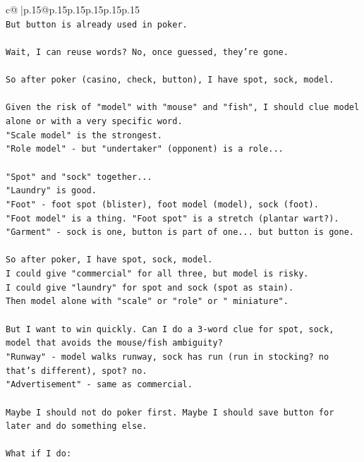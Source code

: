 \documentclass{article}
\begin{document}
{\begin{supertabular}{c@{$\;$}|p{.15\linewidth}@{}p{.15\linewidth}p{.15\linewidth}p{.15\linewidth}p{.15\linewidth}p{.15\linewidth}}
{{{\\ 
\texttt{But button is already used in poker.} \\
\\ 
\texttt{Wait, I can reuse words? No, once guessed, they're gone.} \\
\\ 
\texttt{So after poker (casino, check, button), I have spot, sock, model.} \\
\\ 
\texttt{Given the risk of "model" with "mouse" and "fish", I should clue model alone or with a very specific word.} \\
\texttt{"Scale model" is the strongest.} \\
\texttt{"Role model" {-} but "undertaker" (opponent) is a role...} \\
\\ 
\texttt{"Spot" and "sock" together...} \\
\texttt{"Laundry" is good.} \\
\texttt{"Foot" {-} foot spot (blister), foot model (model), sock (foot).} \\
\texttt{"Foot model" is a thing. "Foot spot" is a stretch (plantar wart?).} \\
\texttt{"Garment" {-} sock is one, button is part of one... but button is gone.} \\
\\ 
\texttt{So after poker, I have spot, sock, model.} \\
\texttt{I could give "commercial" for all three, but model is risky.} \\
\texttt{I could give "laundry" for spot and sock (spot as stain).} \\
\texttt{Then model alone with "scale" or "role" or " miniature".} \\
\\ 
\texttt{But I want to win quickly. Can I do a 3{-}word clue for spot, sock, model that avoids the mouse/fish ambiguity?} \\
\texttt{"Runway" {-} model walks runway, sock has run (run in stocking? no that's different), spot? no.} \\
\texttt{"Advertisement" {-} same as commercial.} \\
\\ 
\texttt{Maybe I should not do poker first. Maybe I should save button for later and do something else.} \\
\\ 
\texttt{What if I do:} \\
}}}
\end{supertabular}}
\end{document}

